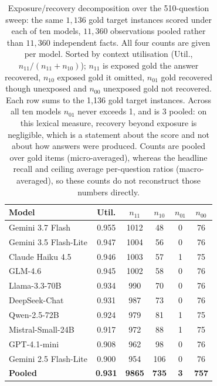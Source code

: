 \documentclass[10pt,twocolumn]{article}
\begin{document}
\begin{table}[tb]\centering\footnotesize
\caption{Exposure/recovery decomposition over the 510-question sweep: the same $1{,}136$ gold target
instances scored under each of ten models, $11{,}360$ observations pooled rather than $11{,}360$ independent
facts. All four counts are given per model. Sorted by context utilisation (Util., $n_{11}/(n_{11}+n_{10})$); $n_{11}$ is exposed gold the answer recovered, $n_{10}$ exposed gold it omitted, $n_{01}$ gold recovered though unexposed and $n_{00}$ unexposed gold not recovered. Each row sums to the 1{,}136 gold target instances. Across all ten models $n_{01}$ never exceeds 1, and is 3 pooled: on this lexical measure, recovery
beyond exposure is negligible, which is a statement about the score and not about how answers were
produced. Counts are pooled over
gold items (micro-averaged), whereas the headline recall and ceiling average per-question ratios
(macro-averaged), so these counts do not reconstruct those numbers directly.}
\label{tab:decomp}
\setlength{\tabcolsep}{3.6pt}
\begin{tabular}{lccccc}
\toprule
Model & Util. & $n_{11}$ & $n_{10}$ & $n_{01}$ & $n_{00}$ \\
\midrule
Gemini 3.7 Flash      & 0.955 & 1012 & 48  & 0 & 76 \\
Gemini 3.5 Flash-Lite & 0.947 & 1004 & 56  & 0 & 76 \\
Claude Haiku 4.5      & 0.946 & 1003 & 57  & 1 & 75 \\
GLM-4.6               & 0.945 & 1002 & 58  & 0 & 76 \\
Llama-3.3-70B         & 0.934 &  990 & 70  & 0 & 76 \\
DeepSeek-Chat         & 0.931 &  987 & 73  & 0 & 76 \\
Qwen-2.5-72B          & 0.924 &  979 & 81  & 1 & 75 \\
Mistral-Small-24B     & 0.917 &  972 & 88  & 1 & 75 \\
GPT-4.1-mini          & 0.908 &  962 & 98  & 0 & 76 \\
Gemini 2.5 Flash-Lite & 0.900 &  954 & 106 & 0 & 76 \\
\midrule
\textbf{Pooled}       & \textbf{0.931} & \textbf{9865} & \textbf{735} & \textbf{3} & \textbf{757} \\
\bottomrule
\end{tabular}
\end{table}
\end{document}
